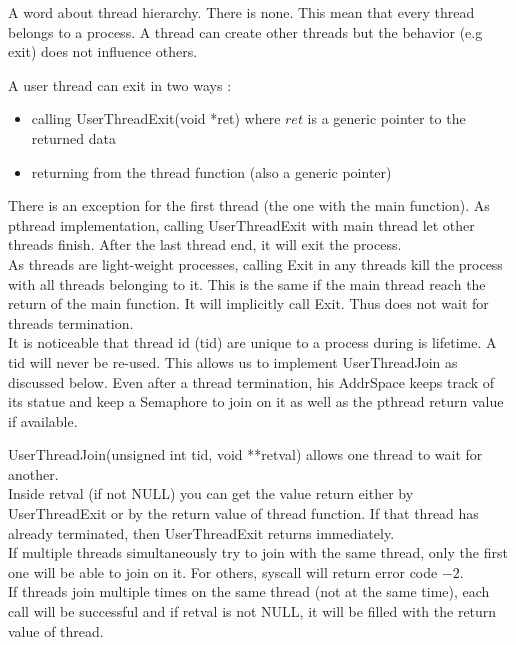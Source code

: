 A word about thread hierarchy. There is none. This mean that every thread
belongs to a process. A thread can create other threads but the behavior (e.g
exit) does not influence others.

A user thread can exit in two ways :
\begin{itemize}
    \item calling \textrm{UserThreadExit(void *ret)} where $ret$ is a generic
        pointer to the returned data
    \item returning from the thread function (also a generic pointer)
\end{itemize}

There is an exception for the first thread (the one with the main function). As
pthread implementation, calling \textrm{UserThreadExit} with main thread let
other threads finish. After the last thread end, it will exit the process.\\

As threads are light-weight processes, calling \textrm{Exit} in any threads
kill the process with all threads belonging to it. This is the same if the main
thread reach the return of the main function. It will implicitly call
\textrm{Exit}. Thus does not wait for threads termination.\\

It is noticeable that thread id (tid) are unique to a process during is
lifetime. A tid will never be re-used. This allows us to implement
\textrm{UserThreadJoin} as discussed below. Even after a thread termination, his
AddrSpace keeps track of its statue and keep a Semaphore to join on it as well
as the pthread return value if available.

\textrm{UserThreadJoin(unsigned int tid, void **retval)} allows one thread to wait for
another.\\
Inside retval (if not NULL) you can get the value return either by
\textrm{UserThreadExit} or by the return value of thread function. If that
thread has already terminated, then \textrm{UserThreadExit} returns
immediately.\\
If multiple threads simultaneously try to join with the same thread, only the
first one will be able to join on it. For others, syscall will return error
code $-2$. \\
If threads join multiple times on the same thread (not at the same time), each
call will be successful and if retval is not NULL, it will be filled with the
return value of thread.\\


